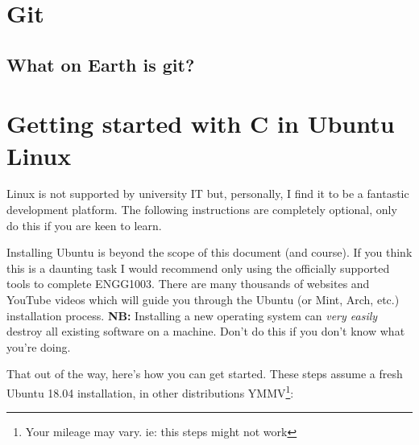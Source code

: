 \documentclass{lab}
\begin{document}
\section{Git}
\subsection{What on Earth is git?}

\section{Getting started with C in Ubuntu Linux}

Linux is not supported by university IT but, personally, I find it to be a fantastic development platform. The following instructions are completely optional, only do this if you are keen to learn.

Installing Ubuntu is beyond the scope of this document (and course). If you think this is a daunting task I would recommend only using the officially supported tools to complete ENGG1003. There are many thousands of websites and YouTube videos which will guide you through the Ubuntu (or Mint, Arch, etc.) installation process. \textbf{NB:} Installing a new operating system can \textit{very easily} destroy all existing software on a machine. Don't do this if you don't know what you're doing.

That out of the way, here's how you can get started. These steps assume a fresh Ubuntu 18.04 installation, in other distributions YMMV\footnote{Your mileage may vary. ie: this steps might not work}:
\end{document}

